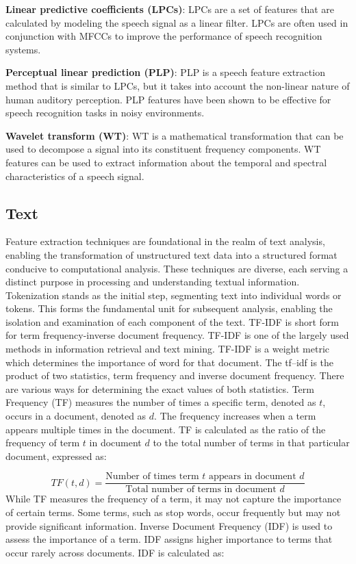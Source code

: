 \documentclass[conference]{IEEEtran}
\begin{document}
\textbf{Linear predictive coefficients (LPCs)}: LPCs\cite{r18} are a set of features that are calculated by modeling the speech signal as a linear filter. LPCs are often used in conjunction with MFCCs to improve the performance of speech recognition systems.

\textbf{Perceptual linear prediction (PLP)}: PLP\cite{r19} is a speech feature extraction method that is similar to LPCs, but it takes into account the non-linear nature of human auditory perception. PLP features have been shown to be effective for speech recognition tasks in noisy environments.


\textbf{Wavelet transform (WT)}: WT\cite{r20} is a mathematical transformation that can be used to decompose a signal into its constituent frequency components. WT features can be used to extract information about the temporal and spectral characteristics of a speech signal.



\subsection{Text}
Feature extraction techniques are foundational in the realm of text analysis\cite{r8}, enabling the transformation of unstructured text data into a structured format conducive to computational analysis. These techniques are diverse, each serving a distinct purpose in processing and understanding textual information.
Tokenization\cite{r10} stands as the initial step, segmenting text into individual words or tokens. This forms the fundamental unit for subsequent analysis, enabling the isolation and examination of each component of the text.
TF-IDF\cite{r9} is short form for term frequency-inverse document frequency. TF-IDF is
one of the largely used methods in information retrieval and text mining. TF-IDF is
a weight metric which determines the importance of word for that document. The tf–idf is the product of two statistics, term frequency and inverse document frequency. There are various ways for determining the exact values of both statistics.
Term Frequency (TF) measures the number of times a specific term, denoted as $t$, occurs in a document, denoted as $d$. The frequency increases when a term appears multiple times in the document. TF is calculated as the ratio of the frequency of term $t$ in document $d$ to the total number of terms in that particular document, expressed as:

\[
TF(t,d) = \frac{\text{Number of times term } t \text{ appears in document } d}{\text{Total number of terms in document } d} \tag{1}
\]
While TF measures the frequency of a term, it may not capture the importance of certain terms. Some terms, such as stop words, occur frequently but may not provide significant information. Inverse Document Frequency (IDF) is used to assess the importance of a term. IDF assigns higher importance to terms that occur rarely across documents. IDF is calculated as:
\end{document}
